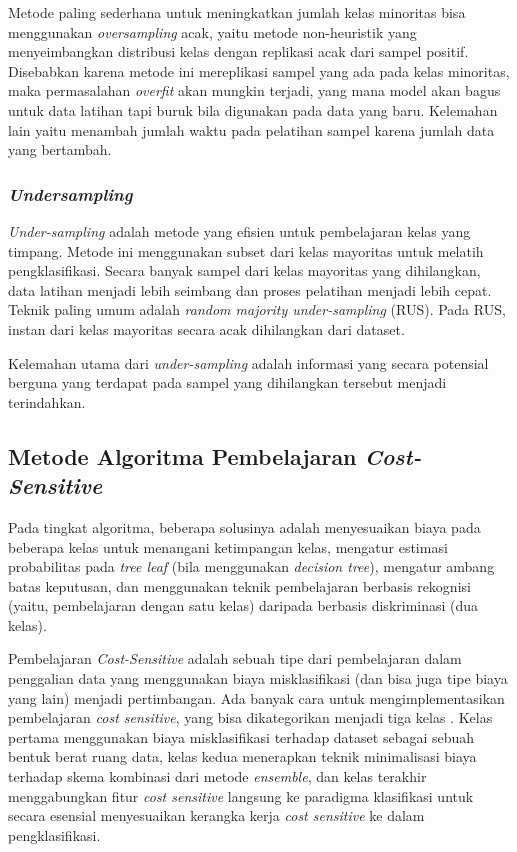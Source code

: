 Metode paling sederhana untuk meningkatkan jumlah kelas minoritas bisa menggunakan \textit{oversampling} acak, yaitu metode non-heuristik yang menyeimbangkan distribusi kelas dengan replikasi acak dari sampel positif.
Disebabkan karena metode ini mereplikasi sampel yang ada pada kelas minoritas, maka permasalahan \textit{overfit} akan mungkin terjadi, yang mana model akan bagus untuk data latihan tapi buruk bila digunakan pada data yang baru.
Kelemahan lain yaitu menambah jumlah waktu pada pelatihan sampel karena jumlah data yang bertambah.

\subsubsection{\textit{Undersampling}}\label{subsubsec:undersampling}

\textit{Under-sampling} adalah metode yang efisien untuk pembelajaran kelas yang timpang.
Metode ini menggunakan subset dari kelas mayoritas untuk melatih pengklasifikasi.
Secara banyak sampel dari kelas mayoritas yang dihilangkan, data latihan menjadi lebih seimbang dan proses pelatihan menjadi lebih cepat.
Teknik paling umum adalah \textit{random majority under-sampling} (RUS).
Pada RUS, instan dari kelas mayoritas secara acak dihilangkan dari dataset.

Kelemahan utama dari \textit{under-sampling} adalah informasi yang secara potensial berguna yang terdapat pada sampel yang dihilangkan tersebut menjadi terindahkan.

\subsection{Metode Algoritma Pembelajaran \textit{Cost-Sensitive}}

Pada tingkat algoritma, beberapa solusinya adalah menyesuaikan biaya pada beberapa kelas untuk menangani ketimpangan kelas, mengatur estimasi probabilitas pada \textit{tree leaf} (bila menggunakan \textit{decision tree}), mengatur ambang batas keputusan, dan menggunakan teknik pembelajaran berbasis rekognisi (yaitu, pembelajaran dengan satu kelas) daripada berbasis diskriminasi (dua kelas).

Pembelajaran \textit{Cost-Sensitive} adalah sebuah tipe dari pembelajaran dalam penggalian data yang menggunakan biaya misklasifikasi (dan bisa juga tipe biaya yang lain) menjadi pertimbangan.
Ada banyak cara untuk mengimplementasikan pembelajaran \textit{cost sensitive}, yang bisa dikategorikan menjadi tiga kelas \cite{he2009learning}.
Kelas pertama menggunakan biaya misklasifikasi terhadap dataset sebagai sebuah bentuk berat ruang data, kelas kedua menerapkan teknik minimalisasi biaya terhadap skema kombinasi dari metode \textit{ensemble}, dan kelas terakhir menggabungkan fitur \textit{cost sensitive} langsung ke paradigma klasifikasi untuk secara esensial menyesuaikan kerangka kerja \textit{cost sensitive} ke dalam pengklasifikasi.

